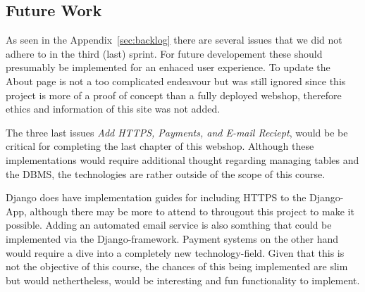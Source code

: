 \subsection{Future Work} 

As seen in the Appendix~\ref{sec:backlog} there are several issues that
we did not adhere to in the third (last) sprint. For future developement these
should presumably be implemented for an enhaced user experience. To update
the About page is not a too complicated endeavour but was still ignored since
this project is more of a proof of concept than a fully deployed webshop,
therefore ethics and information of this site was not added.

The three last issues \textit{Add HTTPS, Payments, and E-mail Reciept}, would
be be critical for completing the last chapter of this webshop. Although these
implementations would require additional thought regarding managing tables
and the DBMS, the technologies are rather outside of the scope of this course.

Django does have implementation guides for including HTTPS to the Django-App,
although there may be more to attend to througout this project to make it
possible. Adding an automated email service is also somthing that could be
implemented via the Django-framework.  Payment systems on the other hand
would require a dive into a completely new technology-field. Given that this
is not the objective of this course, the chances of this being implemented
are slim but would nethertheless, would be interesting and fun functionality
to implement.


